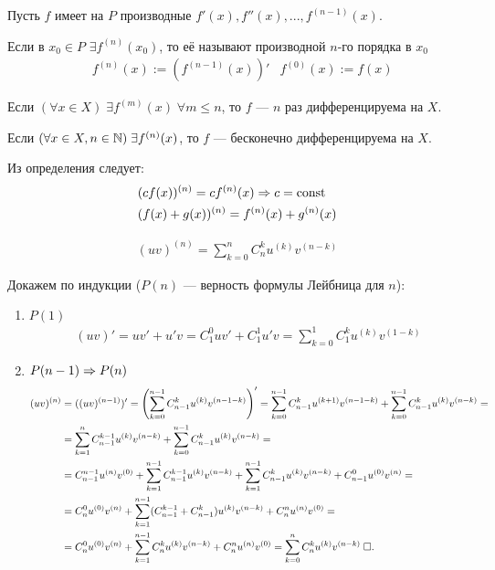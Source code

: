 \documentclass{article}
\begin{document}


Пусть $f$ имеет на $P$ производные $f'(x),f''(x),...,f^{(n-1)}(x)$.

Если в $x_0\in P$ $\exists f^{(n)}(x_0)$, то её называют производной $n$-го порядка в $x_0$
\begin{align*}
	 & f^{(n)}(x):=(f^{(n-1)}(x))' & f^{(0)}(x):=f(x)
\end{align*}


Если $(\forall x\in X)\;\exists f^{(m)}(x)\;\forall m\leq n$, то $f$ --- $n$ раз дифференцируема на $X$.

Если $(\forall x\in X, n\in\N)\;\exists f^{(n)}(x)$, то $f$ --- бесконечно дифференцируема на $X$.


Из определения следует:
\begin{align*}
	 & (cf(x))^{(n)}=cf^{(n)}(x) \Rarr c = \const\\
	 & (f(x)+g(x))^{(n)}=f^{(n)}(x)+g^{(n)}(x)
\end{align*}

\begin{align*}
	(uv)^{(n)}=\sum_{k=0}^{n}C_n^{k}u^{(k)}v^{(n-k)}
\end{align*}

\proof

Докажем по индукции ($P(n)$ --- верность формулы Лейбница для $n$):
\begin{enumerate}
	\item{}$P(1)$
	\begin{align*}
		(uv)'=uv'+u'v=C_1^{0}uv'+C_1^{1}u'v=\sum_{k=0}^{1}C_1^{k}u^{(k)}v^{(1-k)}
	\end{align*}

	\item{}$P(n-1)\Rarr P(n)$
	\begin{align*}
		(uv)^{(n)}
		 & =((uv)^{(n-1)})'=\left(\sum_{k=0}^{n-1}C_{n-1}^{k}u^{(k)}v^{(n-1-k)}\right)'
		=\sum_{k=0}^{n-1}C_{n-1}^{k}u^{(k+1)}v^{(n-1-k)}+\sum_{k=0}^{n-1}C_{n-1}^{k}u^{(k)}v^{(n-k)}=                                                        \\
		 & =\sum_{k=1}^{n}C_{n-1}^{k-1}u^{(k)}v^{(n-k)}+\sum_{k=0}^{n-1}C_{n-1}^{k}u^{(k)}v^{(n-k)}=                                                         \\
		 & =C_{n-1}^{n-1}u^{(n)}v^{(0)}+\sum_{k=1}^{n-1}C_{n-1}^{k-1}u^{(k)}v^{(n-k)}+\sum_{k=1}^{n-1}C_{n-1}^{k}u^{(k)}v^{(n-k)}+C_{n-1}^{0}u^{(0)}v^{(n)}= \\
		 & =C_{n}^{0}u^{(0)}v^{(n)}+\sum_{k=1}^{n-1}(C_{n-1}^{k-1}+C_{n-1}^{k})u^{(k)}v^{(n-k)}+C_{n}^{n}u^{(n)}v^{(0)}=                                     \\
		 & =C_{n}^{0}u^{(0)}v^{(n)}+\sum_{k=1}^{n-1}C_n^{k}u^{(k)}v^{(n-k)}+C_{n}^{n}u^{(n)}v^{(0)}=\sum_{k=0}^{n}C_n^{k}u^{(k)}v^{(n-k)}\qed
	\end{align*}
\end{enumerate}
\end{document}

